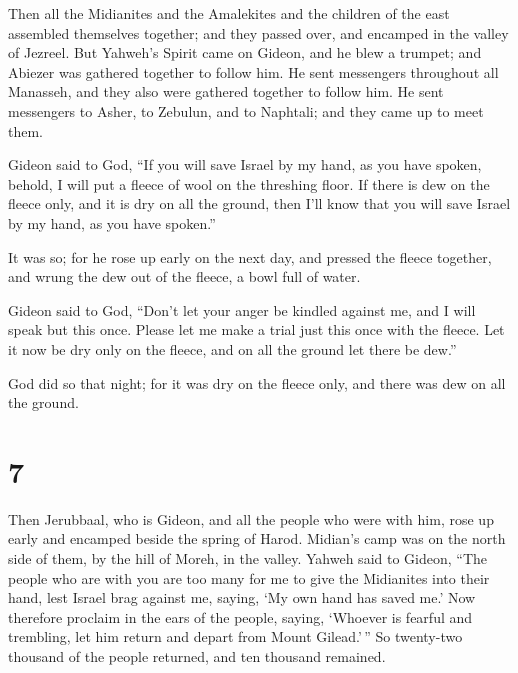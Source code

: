  Then all the Midianites and the Amalekites and the
children of the east assembled themselves together; and they passed
over, and encamped in the valley of Jezreel.  But
Yahweh's Spirit came on Gideon, and he blew a trumpet; and Abiezer was
gathered together to follow him.  He sent messengers
throughout all Manasseh, and they also were gathered together to follow
him. He sent messengers to Asher, to Zebulun, and to Naphtali; and they
came up to meet them.

 Gideon said to God, ``If you will save Israel by my
hand, as you have spoken,  behold, I will put a fleece of
wool on the threshing floor. If there is dew on the fleece only, and it
is dry on all the ground, then I'll know that you will save Israel by my
hand, as you have spoken.''

 It was so; for he rose up early on the next day, and
pressed the fleece together, and wrung the dew out of the fleece, a bowl
full of water.

 Gideon said to God, ``Don't let your anger be kindled
against me, and I will speak but this once. Please let me make a trial
just this once with the fleece. Let it now be dry only on the fleece,
and on all the ground let there be dew.''

 God did so that night; for it was dry on the fleece
only, and there was dew on all the ground.

\hypertarget{section-6}{%
\section{7}\label{section-6}}

 Then Jerubbaal, who is Gideon, and all the people who
were with him, rose up early and encamped beside the spring of Harod.
Midian's camp was on the north side of them, by the hill of Moreh, in
the valley.  Yahweh said to Gideon, ``The people who are
with you are too many for me to give the Midianites into their hand,
lest Israel brag against me, saying, `My own hand has saved me.'
 Now therefore proclaim in the ears of the people, saying,
`Whoever is fearful and trembling, let him return and depart from Mount
Gilead.'\,'' So twenty-two thousand of the people returned, and ten
thousand remained.

